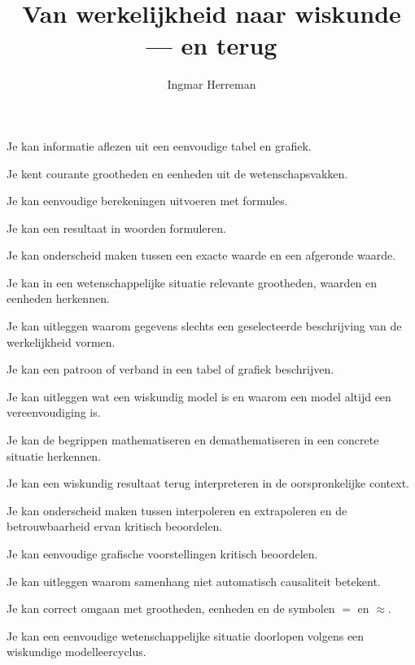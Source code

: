 \documentclass{ximera}
\title{Van werkelijkheid naar wiskunde --- en terug}
\author{Ingmar Herreman}
\begin{document}



















\maketitle



\begin{voorkennis}
  \item Je kan informatie aflezen uit een eenvoudige tabel en grafiek.
  \item Je kent courante grootheden en eenheden uit de wetenschapsvakken.
  \item Je kan eenvoudige berekeningen uitvoeren met formules.
  \item Je kan een resultaat in woorden formuleren.
  \item Je kan onderscheid maken tussen een exacte waarde en een afgeronde waarde.
\end{voorkennis}

\begin{leerdoelen}
  \item Je kan in een wetenschappelijke situatie relevante grootheden, waarden en eenheden herkennen.
  \item Je kan uitleggen waarom gegevens slechts een geselecteerde beschrijving van de werkelijkheid vormen.
  \item Je kan een patroon of verband in een tabel of grafiek beschrijven.
  \item Je kan uitleggen wat een wiskundig model is en waarom een model altijd een vereenvoudiging is.
  \item Je kan de begrippen mathematiseren en demathematiseren in een concrete situatie herkennen.
  \item Je kan een wiskundig resultaat terug interpreteren in de oorspronkelijke context.
  \item Je kan onderscheid maken tussen interpoleren en extrapoleren en de betrouwbaarheid ervan kritisch beoordelen.
  \item Je kan eenvoudige grafische voorstellingen kritisch beoordelen.
  \item Je kan uitleggen waarom samenhang niet automatisch causaliteit betekent.
  \item Je kan correct omgaan met grootheden, eenheden en de symbolen $=$ en $\approx$.
  \item Je kan een eenvoudige wetenschappelijke situatie doorlopen volgens een wiskundige modelleercyclus.
\end{leerdoelen}
\end{document}
